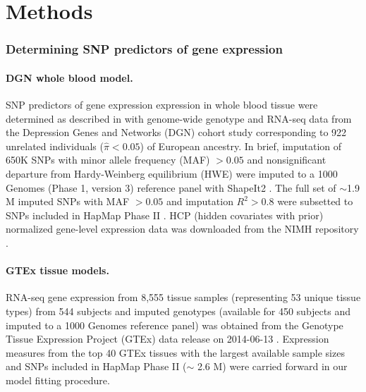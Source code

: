 \documentclass[10pt]{article}
\begin{document}
\section*{Methods}

\subsubsection*{Determining SNP predictors of gene expression}

\paragraph{DGN whole blood model.}SNP predictors of gene expression expression in whole blood tissue were determined as described in \cite{Wheeler2016} with genome-wide genotype and RNA-seq data from the Depression Genes and Networks (DGN) cohort study \cite{Battle2014} corresponding to 922 unrelated individuals ($\hat{\pi} < 0.05$) of European ancestry. In brief, imputation of 650K SNPs with minor allele frequency (MAF) $> 0.05$  and nonsignificant departure from Hardy-Weinberg equilibrium (HWE) were imputed to a 1000 Genomes (Phase 1, version 3) reference panel \cite{The1000GenomesProjectConsortium2012} with ShapeIt2 \cite{Delaneau2012}. The full set of $\sim$1.9 M imputed SNPs with MAF $ > 0.05$ and imputation $R^2 > 0.8$ were subsetted to SNPs included in HapMap Phase II \cite{International2003}. HCP (hidden covariates with prior) normalized gene-level expression data was downloaded from the NIMH repository \cite{Wheeler2016}. 

\paragraph{GTEx tissue models.} RNA-seq gene expression from 8,555 tissue samples (representing 53 unique tissue types) from 544 subjects and imputed genotypes (available for 450 subjects and imputed to a 1000 Genomes reference panel) was obtained from the Genotype Tissue Expression Project (GTEx) data release on 2014-06-13 \cite{TheGTExConsortium2015}. Expression measures from the top 40 GTEx tissues with the largest available sample sizes \cite{TheGTExConsortium2015,Wheeler2016} and SNPs included in HapMap Phase II ($\sim$ 2.6 M) were carried forward in our model fitting procedure. 
\end{document}
